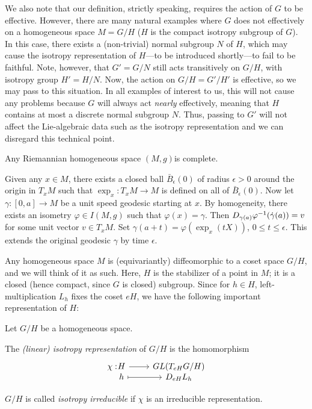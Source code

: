 We also note that our definition, strictly speaking, requires the action of $G$ to be effective. However, there are many natural examples where $G$ does not effectively on a homogeneous space $M=G/H$ ($H$ is the compact isotropy subgroup of $G$). In this case, there exists a (non-trivial) normal subgroup $N$ of $H$, which may cause the isotropy representation of $H$---to be introduced shortly---to fail to be faithful. Note, however, that $G'=G/N$ still acts transitively on $G/H$, with isotropy group $H'=H/N$. Now, the action on $G/H=G'/H'$ is effective, so we may pass to this situation. In all examples of interest to us, this will not cause any problems because $G$ will always act \emph{nearly} effectively, meaning that $H$ contains at most a discrete normal subgroup $N$. Thus, passing to $G'$ will not affect the Lie-algebraic data such as the isotropy representation and we can disregard this technical point.

\begin{prop}
	Any Riemannian homogeneous space $(M,g)$is complete.
\end{prop}
\begin{myproof}
	Given any $x\in M$, there exists a closed ball $\bar B_\epsilon(0)$ of radius $\epsilon>0$ around the origin in $T_xM$ such that $\exp_x:T_xM\to M$ is defined on all of $\bar B_\epsilon(0)$. Now let $\gamma:[0,a]\to M$ be a unit speed geodesic starting at $x$. By homogeneity, there exists an isometry $\varphi\in I(M,g)$ such that $\varphi(x)=\gamma$. Then $D_{\gamma(a)}\varphi^{-1}(\dot \gamma(a))=v$ for some unit vector $v\in T_xM$. Set $\gamma(a+t)=\varphi(\exp_x(tX))$, $0\leq t\leq \epsilon$. This extends the original geodesic $\gamma$ by time $\epsilon$. 
\end{myproof}

Any homogeneous space $M$ is (equivariantly) diffeomorphic to a coset space $G/H$, and we will think of it as such. Here, $H$ is the stabilizer of a point in $M$; it is a closed (hence compact, since $G$ is closed) subgroup. Since for $h\in H$, left-multiplication $L_h$ fixes the coset $eH$, we have the following important representation of $H$:

\begin{mydef}
	Let $G/H$ be a homogeneous space.
	\begin{numberedlist}
		\item The \emph{(linear) isotropy representation} of $G/H$ is the homomorphism
		\begin{equation*}
			\begin{tikzcd}[row sep=-0.15cm]
				\chi: &[-32pt]H \ar[r] & GL(T_{eH}G/H)\\
				& h \ar[r,mapsto] & \dif_{eH} L_h
			\end{tikzcd}
		\end{equation*}
		\item $G/H$ is called \emph{isotropy irreducible} if $\chi$ is an irreducible representation.
	\end{numberedlist}
\end{mydef}

